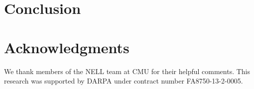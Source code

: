\section{Conclusion}


\section*{Acknowledgments}
We thank members of the NELL team at CMU for their helpful comments.
This research was supported by
DARPA under contract number FA8750-13-2-0005.